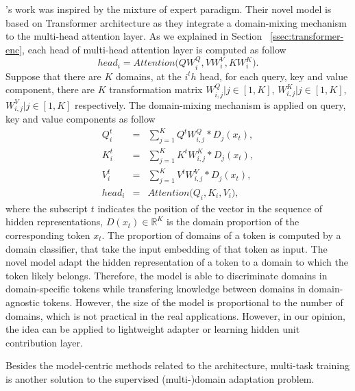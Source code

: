 \citet{Jiang20Multi}'s work was inspired by the mixture of expert paradigm. Their novel model is based on Transformer architecture \citep{Vaswani17attention} as they integrate a domain-mixing mechanism to the multi-head attention layer. As we explained in Section ~\ref{ssec:transformer-enc}, each head of multi-head attention layer is computed as follow
\begin{equation}
head_i = Attention \big(QW_i^Q, VW_i^V, KW_i^K \big).
\end{equation}
Suppose that there are $K$ domains, at the $i^th$ head, for each query, key and value component, there are $K$ transformation matrix $W_{i,j}^Q | j \in [1,K]$, $W_{i,j}^K | j \in [1,K]$, $W_{i,j}^V | j \in [1,K]$ respectively. The domain-mixing mechanism is applied on query, key and value components as follow
\begin{equation}
\begin{array}{rcl}
Q_i^t &=& \sum_{j=1}^K Q^tW_{i,j}^Q*\mathit{D}_j(x_t),\\
K_i^t &=& \sum_{j=1}^K K^tW_{i,j}^K*\mathit{D}_j(x_t),\\
V_i^t &=& \sum_{j=1}^K V^tW_{i,j}^V*\mathit{D}_j(x_t),\\
head_i &=& Attention \big( Q_i, K_i, V_i\big),
\end{array}
\end{equation}
where the subscript $t$ indicates the position of the vector in the sequence of hidden representations, $\mathit{D}(x_t) \in \mathbb{R}^{K}$ is the domain proportion of the corresponding token $x_t$. The proportion of domains of a token is computed by a domain classifier, that take the input embedding of that token as input. The novel model adapt the hidden representation of a token to a domain to which the token likely belongs. Therefore, the model is able to discriminate domains in domain-specific tokens while transfering knowledge between domains in domain-agnostic tokens. However, the size of the model is proportional to the number of domains, which is not practical in the real applications. However, in our opinion, the idea can be applied to lightweight adapter or learning hidden unit contribution layer.

Besides the model-centric methods related to the architecture, multi-task training is another solution to the supervised (multi-)domain adaptation problem. 

